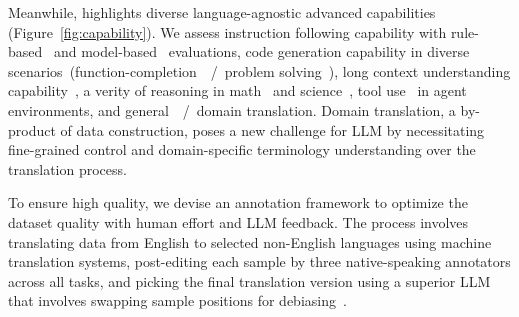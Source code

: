 Meanwhile, \name highlights diverse language-agnostic advanced capabilities  (Figure~\ref{fig:capability}). 
We assess instruction following capability with rule-based~\cite{zhou2023instruction} and model-based~\cite{li2024crowdsourced} evaluations, code generation capability in diverse scenarios~(function-completion~\cite{liu2024your}~/~problem solving~\cite{jain2024livecodebench}), long context understanding capability~\cite{hsieh2024ruler}, a verity of reasoning in math~\cite{shi2023language} and science~\cite{Rein2023GPQAAG}, tool use~\cite{srinivasan2023nexusraven} in agent environments, and general~\cite{costa2022no}~/~domain translation. 
Domain translation, a by-product of data construction, poses a new challenge for LLM by necessitating fine-grained control and domain-specific terminology understanding over the translation process.


To ensure high quality, we devise an annotation framework to optimize the dataset quality with human effort and LLM feedback. 
The process involves translating data from English to selected non-English languages using machine translation systems, post-editing each sample by three native-speaking annotators across all tasks, and picking the final translation version using a superior LLM that involves swapping sample positions for debiasing~\cite{wang2024large,li2024crowdsourced}.




